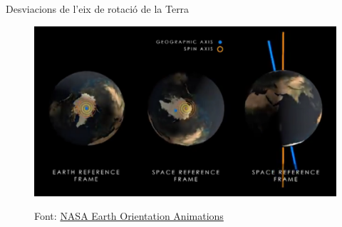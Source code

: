 \documentclass{beamer} %
\begin{document}
\begin{frame}{Desviacions de l'eix de rotació de la Terra}
\begin{minipage}{0.49\textwidth}
\begin{figure}
      \href{https://youtu.be/KnPk2T_kpco}{
        \includegraphics[width=\textwidth, keepaspectratio]{../Images/polarMotion_video_frame.png}
      }
      \vspace{-0.5cm}
      \caption{\tiny Font: \href{https://svs.gsfc.nasa.gov/20196}{NASA Earth Orientation Animations}}
    \end{figure}
  \end{minipage}
\end{frame}
\end{document}
